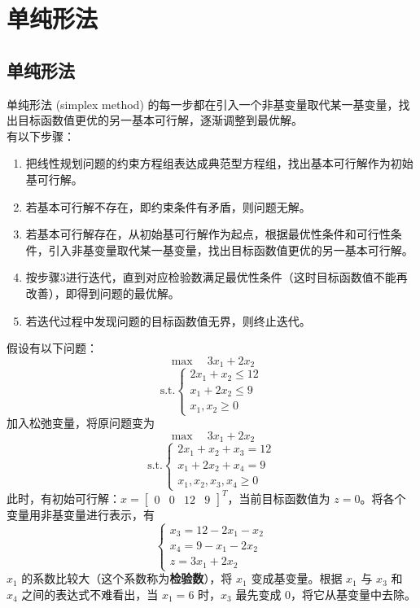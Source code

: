 \section{单纯形法}
\subsection{单纯形法}
单纯形法 (simplex method) 的每一步都在引入一个非基变量取代某一基变量，找出目标函数值更优的另一基本可行解，逐渐调整到最优解。 \\
有以下步骤：
\begin{enumerate}
    \item 把线性规划问题的约束方程组表达成典范型方程组，找出基本可行解作为初始基可行解。
    \item 若基本可行解不存在，即约束条件有矛盾，则问题无解。
    \item 若基本可行解存在，从初始基可行解作为起点，根据最优性条件和可行性条件，引入非基变量取代某一基变量，找出目标函数值更优的另一基本可行解。
    \item 按步骤3进行迭代，直到对应检验数满足最优性条件（这时目标函数值不能再改善），即得到问题的最优解。
    \item 若迭代过程中发现问题的目标函数值无界，则终止迭代。
\end{enumerate}
假设有以下问题：
$$
\max \quad 3x_1 + 2x_2
$$
$$
\text{s.t.} 
\begin{cases}
    2x_1 + x_2 \le 12 \\
    x_1 + 2x_2 \le 9 \\
    x_1, x_2 \ge 0
\end{cases}
$$
加入松弛变量，将原问题变为 
$$
\max \quad 3x_1 + 2x_2
$$
$$
\text{s.t.} 
\begin{cases}
    2x_1 + x_2 + x_3 = 12 \\
    x_1 + 2x_2 + x_4 = 9 \\
    x_1, x_2, x_3, x_4 \ge 0
\end{cases}
$$
此时，有初始可行解：$x = \begin{bmatrix} 0 & 0 & 12 & 9 \end{bmatrix}^T$，当前目标函数值为 $z = 0$。将各个变量用非基变量进行表示，有
$$
\begin{cases}
    x_3 = 12 - 2x_1 - x_2 \\ 
    x_4 = 9 - x_1 - 2x_2 \\ 
    z = 3x_1 + 2x_2
\end{cases}
$$
$x_1$ 的系数比较大（这个系数称为\textbf{检验数}），将 $x_1$ 变成基变量。根据 $x_1$ 与 $x_3$ 和 $x_4$ 之间的表达式不难看出，当 $x_1 = 6$ 时，$x_3$ 最先变成 0，将它从基变量中去除。
